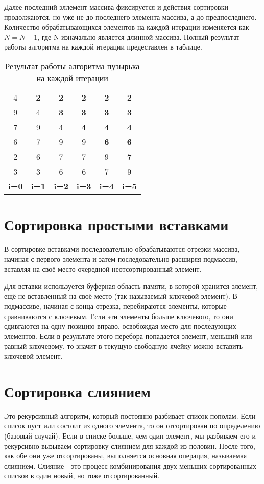 Далее последний эллемент массива фиксируется и действия сортировки продолжаются, но уже не до последнего элемента массива, а до предпоследнего. Количество обрабатывающихся элементов на каждой итерации изменяется как $N=N-1$, где N изначально является длинной массива. Полный результат работы алгоритма на каждой итерации предеставлен в таблице.

\begin{table}
	\caption{Результат работы алгоритма пузырька на каждой итерации}\label{table:bubbleResult}
	\begin{center}
		\begin{tabular}{cccccc}
            4 & \textbf{2} & \textbf{2} & \textbf{2} & \textbf{2} & \textbf{2} \\
            9 & 4 & \textbf{3} & \textbf{3} & \textbf{3} & \textbf{3} \\
            7 & 9 & 4 & \textbf{4} & \textbf{4} & \textbf{4} \\
            6 & 7 & 9 & 9 & \textbf{6} & \textbf{6} \\
            2 & 6 & 7 & 7 & 9 & \textbf{7} \\
            3 & 3 & 6 & 6 & 7 & 9 \\
            \textbf{i=0} & \textbf{i=1} & \textbf{i=2} & \textbf{i=3} & \textbf{i=4} & \textbf{i=5}\\
		\end{tabular}
	\end{center}
\end{table}

\section{ Сортировка простыми вставками}
В сортировке вставками последовательно обрабатываются отрезки массива, начиная с первого элемента и затем последовательно расширяя подмассив, вставляя на своё место очередной неотсортированный элемент.

Для вставки используется буферная область памяти, в которой хранится элемент, ещё не вставленный на своё место (так называемый ключевой элемент). В подмассиве, начиная с конца отрезка, перебираются элементы, которые сравниваются с ключевым. Если эти элементы больше ключевого, то они сдивгаются на одну позицию вправо, освобождая место для последующих элементов. Если в результате этого перебора попадается элемент, меньший или равный ключевому, то значит в текущую свободную ячейку можно вставить ключевой элемент.

\section{ Сортировка слиянием}
Это рекурсивный алгоритм, который постоянно разбивает список пополам. Если список пуст или состоит из одного элемента, то он отсортирован по определению (базовый случай). Если в списке больше, чем один элемент, мы разбиваем его и рекурсивно вызываем сортировку слиянием для каждой из половин. После того, как обе они уже отсортированы, выполняется основная операция, называемая слиянием. Слияние - это процесс комбинирования двух меньших сортированных списков в один новый, но тоже отсортированный.

